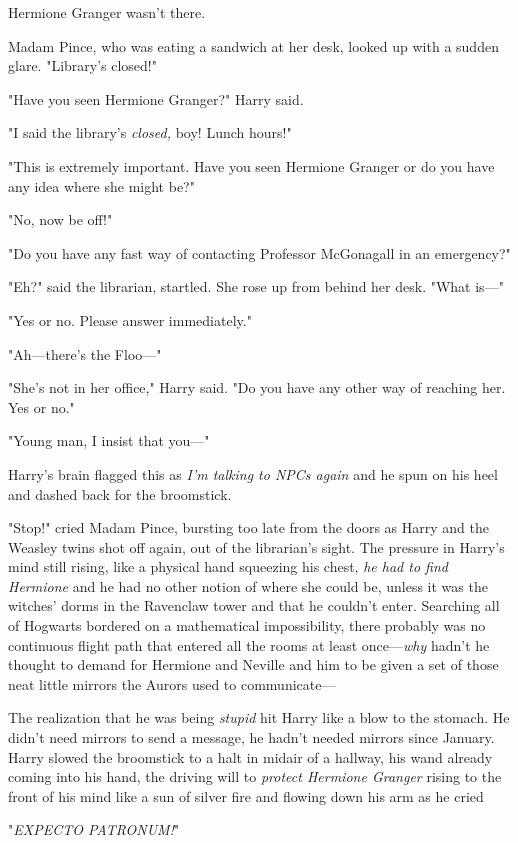 Hermione Granger wasn't there.

Madam Pince, who was eating a sandwich at her desk, looked up with a sudden
glare. "Library's closed!"

"Have you seen Hermione Granger?" Harry said.

"I said the library's \emph{closed,} boy! Lunch hours!"

"This is extremely important. Have you seen Hermione Granger or do you have any
idea where she might be?"

"No, now be off!"

"Do you have any fast way of contacting Professor McGonagall in an emergency?"

"Eh?" said the librarian, startled. She rose up from behind her desk. "What
is\mbox{---}"

"Yes or no. Please answer immediately."

"Ah---there's the Floo\mbox{---}"

"She's not in her office," Harry said. "Do you have any other way of reaching
her. Yes or no."

"Young man, I insist that you\mbox{---}"

Harry's brain flagged this as \emph{I'm talking to NPCs again} and he spun on
his heel and dashed back for the broomstick.

"Stop!" cried Madam Pince, bursting too late from the doors as Harry and the
Weasley twins shot off again, out of the librarian's sight. The pressure in
Harry's mind still rising, like a physical hand squeezing his chest, \emph{he
had to find Hermione} and he had no other notion of where she could be, unless
it was the witches' dorms in the Ravenclaw tower and that he couldn't enter.
Searching all of Hogwarts bordered on a mathematical impossibility, there
probably was no continuous flight path that entered all the rooms at least
once---\emph{why} hadn't he thought to demand for Hermione and Neville and him
to be given a set of those neat little mirrors the Aurors used to communicate---

The realization that he was being \emph{stupid} hit Harry like a blow to the
stomach. He didn't need mirrors to send a message, he hadn't needed mirrors
since January. Harry slowed the broomstick to a halt in midair of a hallway,
his wand already coming into his hand, the driving will to \emph{protect
Hermione Granger} rising to the front of his mind like a sun of silver fire and
flowing down his arm as he cried

"\emph{EXPECTO PATRONUM!}"

